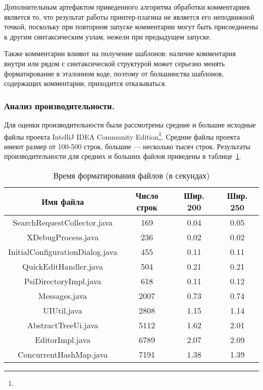 Дополнительным артефактом приведенного алгоритма обработки комментариев является то,
что результат работы
принтер-плагина не является его неподвижной точкой, поскольку при повторном запуске
комментарии могут быть присоединены к другим синтаксическим узлам, нежели при предыдущем
запуске.

Также комментарии влияют на получение шаблонов:
наличие комментария внутри или рядом с синтаксической структурой
может серьезно менять форматирование в эталонном коде, поэтому от большинства
шаблонов, содержащих комментарии, приходится отказываться.

\subsubsection{Анализ производительности.}

Для оценки производительности были рассмотрены средние и большие исходные файлы
проекта IntelliJ IDEA Community
Edition\footnote{}.
Средние файлы проекта имеют размер от 100-500 строк, большие --- несколько тысяч строк.
Результаты производительности для средних и больших файлов приведены в
таблице~\ref{tbl:pluginPerformanceTbl}.

\begin{table}[h!]
	\centering

    \begin{tabular}{c|c|c| c}
    Имя файла & Число строк & Шир. 200 & Шир. 250 \\
    \hline
    SearchRequestCollector.java & 169 & 0.04 & 0.05\\
    XDebugProcess.java & 236 & 0.02 & 0.02\\
    InitialConfigurationDialog.java & 455 & 0.11 & 0.11 \\
    QuickEditHandler.java & 504 & 0.21 & 0.21\\
    PsiDirectoryImpl.java & 618 & 0.11 & 0.12\\
    \hline
    Messages.java & 2007 & 0.73 & 0.74 \\
    UIUtil.java & 2808 & 1.15 & 1.14 \\
    AbstractTreeUi.java & 5112 & 1.62 & 2.01 \\
    EditorImpl.java & 6789 & 2.07 & 2.09\\
    ConcurrentHashMap.java & 7191 & 1.38 & 1.39
    \end{tabular}
  \vskip 2mm
  \caption{Время форматирования файлов (в секундах)}
  \label{tbl:pluginPerformanceTbl}
\end{table}

